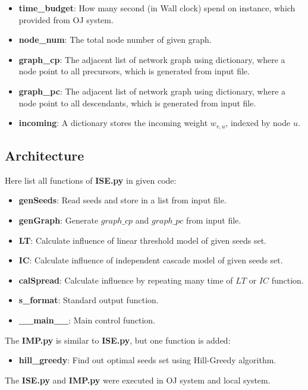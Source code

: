 \documentclass[conference,compsoc]{IEEEtran}
\begin{document}
\begin{itemize}
  \item \textbf{time\_budget}: How many second (in Wall clock) spend on instance,
	  which provided from OJ system.
  \item \textbf{node\_num}: The total node number of given graph.
  \item \textbf{graph\_cp}: The adjacent list of network graph using dictionary,
	  where a node point to all precursors, which is generated from input file.
  \item \textbf{graph\_pc}: The adjacent list of network graph using dictionary,
	  where a node point to all descendants, which is generated from input
		file.
  \item \textbf{incoming}: A dictionary stores the incoming weight $w_{v,u}$,
	  indexed by node $u$.
\end{itemize}


\subsection{Architecture}
Here list all functions of \textbf{ISE.py} in given code:
\begin{itemize}
    \item \textbf{genSeeds}: Read seeds and store in a list from input file.
    \item \textbf{genGraph}: Generate $graph\_cp$ and $graph\_pc$ from input file.
    \item \textbf{LT}: Calculate influence of linear threshold model of given seeds
	    set.
    \item \textbf{IC}: Calculate influence of independent cascade model of given
	    seeds set.
    \item \textbf{calSpread}: Calculate influence by repeating many time of $LT$
	    or $IC$ function.
    \item \textbf{s\_format}: Standard output function. 
    \item \textbf{\_\_main\_\_}: Main control function. 
\end{itemize}
The \textbf{IMP.py} is similar to \textbf{ISE.py}, but one function is added:
\begin{itemize}
    \item \textbf{hill\_greedy}: Find out optimal seeds set using Hill-Greedy
	    algorithm.
\end{itemize}

The \textbf{ISE.py} and \textbf{IMP.py} were executed in OJ system and local
system.
\end{document}

